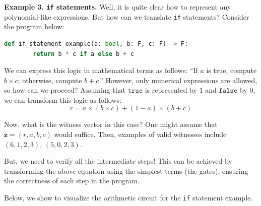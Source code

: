 \documentclass[../lecture-notes-148x210.tex]{subfiles}
\begin{document}
\textbf{Example 3. \texttt{if} statements.} Well, it is quite clear how to represent any polynomial-like expressions. But how can we translate \texttt{if} statements? Consider the program below:

\begin{lstlisting}[language=Python,numbers=none]
    def if_statement_example(a: bool, b: F, c: F) -> F:
        return b * c if a else b + c
\end{lstlisting}

We can express this logic in mathematical terms as follows: ``If $a$ is true, compute 
$b \times c$; otherwise, compute $b + c$.'' However, only numerical expressions are allowed, so how can we proceed? Assuming that
$\texttt{true}$ is represented by $1$ and $\texttt{false}$ by $0$, we can transform this logic as follows:
\begin{equation*}
    r = a \times (b \times c) + (1 - a) \times (b + c)    
\end{equation*}

Now, what is the witness vector in this case? One might assume that $\mathbf{z} = (r, a, b, c)$ would suffice. Then, examples of valid witnesses include $(6, 1, 2, 3)$, $(5, 0, 2, 3)$.

But, we need to verify all the intermediate steps! This can be achieved by transforming the above
equation using the simplest terms (the gates), ensuring the correctness of each step in the program.

Below, we show to visualize the arithmetic circuit for the \texttt{if} statement example.
\end{document}
